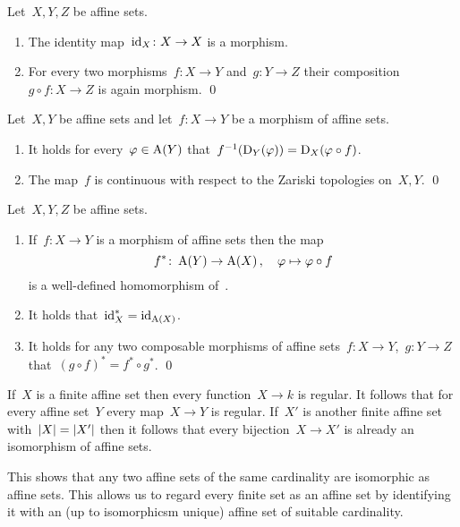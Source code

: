 \begin{lemma}
  Let~$X, Y, Z$ be affine sets.
  \begin{enumerate}
    \item
      The identity map~$\operatorname{id}_X \colon X \to X$ is a morphism.
    \item
      For every two morphisms~$f \colon X \to Y$ and~$g \colon Y \to Z$ their composition~$g \circ f \colon X \to Z$ is again morphism.
    \qed
  \end{enumerate}
\end{lemma}


\begin{lemma}
  Let~$X,Y$ be affine sets and let~$f \colon X \to Y$ be a morphism of affine sets.
  \begin{enumerate}
    \item
      It holds for every~$\varphi \in \operatorname{A}(Y)$ that~$f^{-1}(\operatorname{D}_Y(\varphi)) = \operatorname{D}_X(\varphi \circ f)$.
    \item
      The map~$f$ is continuous with respect to the Zariski topologies on~$X, Y$.
    \qed
  \end{enumerate}
\end{lemma}


\begin{lemma}
  \label{fuctoriality of the coordinate ring}
  Let~$X, Y, Z$ be affine sets.
  \begin{enumerate}
    \item
      If~$f \colon X \to Y$ is a morphism of affine sets then the map
      \[
                f^*
        \colon  \operatorname{A}(Y)
        \to     \operatorname{A}(X) \,,
        \quad   \varphi
        \mapsto \varphi \circ f
      \]
      is a well-defined homomorphism of~.
    \item
      It holds that~$\operatorname{id}_X^* = \operatorname{id}_{\operatorname{A}(X)}$.
    \item
      It holds for any two composable morphisms of affine sets~$f \colon X \to Y$,~$g \colon Y \to Z$ that~$(g \circ f)^* = f^* \circ g^*$.
    \qed
  \end{enumerate}
\end{lemma}


\begin{fluff}
  If~$X$ is a finite affine set then every function~$X \to k$ is regular.
  It follows that for every affine set~$Y$ every map~$X \to Y$ is regular.
  If~$X'$ is another finite affine set with~$\lvert X\rvert = \lvert X'\rvert$ then it follows that every bijection~$X \to X'$ is already an isomorphism of affine sets.


  This shows that any two affine sets of the same cardinality are isomorphic as affine sets.
  This allows us to regard every finite set as an affine set by identifying it with an (up to isomorphicsm unique) affine set of suitable cardinality.
\end{fluff}


